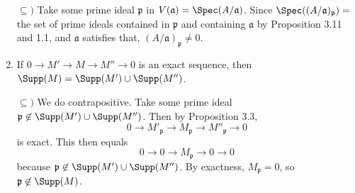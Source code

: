 \begin{questions}
\begin{enumerate}
\begin{solution}
		$\subseteq) $ Take some prime ideal $\mathfrak{p} $ in $V(\mathfrak{a}) = \Spec(A / \mathfrak{a}) $.
		Since $\Spec((A / \mathfrak{a})_{\mathfrak{p}}) = $ the set of prime ideals contained in $\mathfrak{p} $ and containing $\mathfrak{a} $ by Proposition 3.11 and 1.1, and $\mathfrak{a} $ satisfies that, $(A / \mathfrak{a})_{\mathfrak{p}}\ne 0 $.
	\end{solution}
	\item If $0 \to M' \to M \to M'' \to 0 $ is an exact sequence, then $\Supp(M) = \Supp(M') \cup \Supp(M'') $.
	\begin{solution}
		$\subseteq) $ We do contrapositive.
		Take some prime ideal $\mathfrak{p} \not\in \Supp(M') \cup \Supp(M'') $.
		Then by Proposition 3.3,
		\[
			0 \to M'_{\mathfrak{p}} \to M_{\mathfrak{p}} \to M''_{\mathfrak{p}} \to 0
		\] 
		is exact.
		This then equals
		\[
			0 \to 0 \to M_{\mathfrak{p}} \to 0 \to 0
		\] 
		because $\mathfrak{p}\not\in \Supp(M') \cup \Supp(M'') $.
		By exactness, $M_{\mathfrak{p}} =0 $, so $\mathfrak{p} \not\in \Supp(M)$.


\end{solution}
\end{enumerate}
\end{questions}

